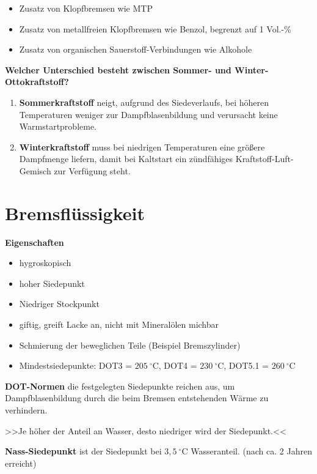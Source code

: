\begin{enumerate}
  \begin{itemize}
  \item
    Zusatz von Klopfbremsen wie MTP
  \item
    Zusatz von metallfreien Klopfbremsen wie Benzol, begrenzt auf 1
    Vol.-\%
  \item
    Zusatz von organischen Sauerstoff-Verbindungen wie Alkohole
  \end{itemize}
\end{enumerate}

\textbf{Welcher Unterschied besteht zwischen Sommer- und
Winter-Ottokraftstoff?}

\begin{enumerate}
\item
  \textbf{Sommerkraftstoff} neigt, aufgrund des Siedeverlaufs, bei
  höheren Temperaturen weniger zur Dampfblasenbildung und verursacht
  keine Warmstartprobleme.
\item
  \textbf{Winterkraftstoff} muss bei niedrigen Temperaturen eine größere
  Dampfmenge liefern, damit bei Kaltstart ein zündfähiges
  Kraftstoff-Luft-Gemisch zur Verfügung steht.
\end{enumerate}

\section{Bremsflüssigkeit}\label{bremsfluessigkeit}

\textbf{Eigenschaften}

\begin{itemize}
\item
  hygroskopisch
\item
  hoher Siedepunkt
\item
  Niedriger Stockpunkt
\item
  giftig, greift Lacke an, nicht mit Mineralölen michbar
\item
  Schmierung der beweglichen Teile (Beispiel Bremszylinder)
\item
  Mindestsiedepunkte: DOT3 = $205~^\circ\text{C}$, DOT4 =
  $230~^\circ\text{C}$, DOT5.1 = $260~^\circ\text{C}$
\end{itemize}

\textbf{DOT-Normen} die festgelegten Siedepunkte reichen aus, um
Dampfblasenbildung durch die beim Bremsen entstehenden Wärme zu
verhindern.

>>Je höher der Anteil an Wasser, desto niedriger wird der Siedepunkt.<<

\textbf{Nass-Siedepunkt} ist der Siedepunkt bei $3,5~^\circ\text{C}$
Wasseranteil. (nach ca. 2 Jahren erreicht)

